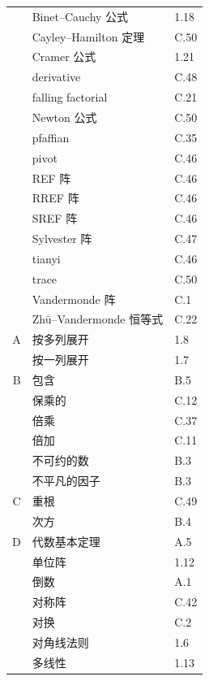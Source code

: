 \documentclass[../libro.tex]{subfiles}
\begin{document}
\begin{longtable}[c]{rll}
    {} & Binet--Cauchy 公式         & 1.18 \\
    {} & Cayley--Hamilton 定理      & C.50 \\
    {} & Cramer 公式                & 1.21 \\
    {} & derivative               & C.48 \\
    {} & falling factorial        & C.21 \\
    {} & Newton 公式                & C.50 \\
    {} & pfaffian                 & C.35 \\
    {} & pivot                    & C.46 \\
    {} & REF 阵                    & C.46 \\
    {} & RREF 阵                   & C.46 \\
    {} & SREF 阵                   & C.46 \\
    {} & Sylvester 阵              & C.47 \\
    {} & tianyi                   & C.46 \\
    {} & trace                    & C.50 \\
    {} & Vandermonde 阵            & C.1  \\
    {} & Zhū--Vandermonde 恒等式     & C.22 \\

    A  & 按多列展开                    & 1.8  \\
    {} & 按一列展开                    & 1.7  \\

    B  & 包含                       & B.5  \\
    {} & 保乘的                      & C.12 \\
    {} & 倍乘                       & C.37 \\
    {} & 倍加                       & C.11 \\
    {} & 不可约的数                    & B.3  \\
    {} & 不平凡的因子                   & B.3  \\

    C  & 重根                       & C.49 \\
    {} & 次方                       & B.4  \\

    D  & 代数基本定理                   & A.5  \\
    {} & 单位阵                      & 1.12 \\
    {} & 倒数                       & A.1  \\
    {} & 对称阵                      & C.42 \\
    {} & 对换                       & C.2  \\
    {} & 对角线法则                    & 1.6  \\
    {} & 多线性                      & 1.13 \\


\end{longtable}
\end{document}
